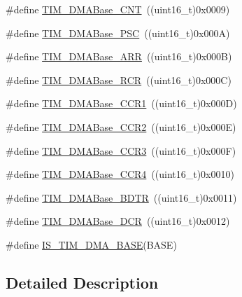 \begin{DoxyCompactItemize}
\#define \mbox{\hyperlink{group___t_i_m___d_m_a___base__address_gacab604257d144cf3a59b360cbc958ec9}{T\+I\+M\+\_\+\+D\+M\+A\+Base\+\_\+\+C\+NT}}~((uint16\+\_\+t)0x0009)
\item 
\#define \mbox{\hyperlink{group___t_i_m___d_m_a___base__address_gab8dd06970f235fe9f6997e0975237388}{T\+I\+M\+\_\+\+D\+M\+A\+Base\+\_\+\+P\+SC}}~((uint16\+\_\+t)0x000\+A)
\item 
\#define \mbox{\hyperlink{group___t_i_m___d_m_a___base__address_gaab8a66f70e59b5916b4bba344746d652}{T\+I\+M\+\_\+\+D\+M\+A\+Base\+\_\+\+A\+RR}}~((uint16\+\_\+t)0x000\+B)
\item 
\#define \mbox{\hyperlink{group___t_i_m___d_m_a___base__address_ga97f9edceee5c99b32aaa2c6daf849b7d}{T\+I\+M\+\_\+\+D\+M\+A\+Base\+\_\+\+R\+CR}}~((uint16\+\_\+t)0x000\+C)
\item 
\#define \mbox{\hyperlink{group___t_i_m___d_m_a___base__address_ga235a47fa47fd19594a111e6e48c0d5a2}{T\+I\+M\+\_\+\+D\+M\+A\+Base\+\_\+\+C\+C\+R1}}~((uint16\+\_\+t)0x000\+D)
\item 
\#define \mbox{\hyperlink{group___t_i_m___d_m_a___base__address_ga0e2150dcd3afe31ecb793aa471b3b972}{T\+I\+M\+\_\+\+D\+M\+A\+Base\+\_\+\+C\+C\+R2}}~((uint16\+\_\+t)0x000\+E)
\item 
\#define \mbox{\hyperlink{group___t_i_m___d_m_a___base__address_ga590c90085bd2b206b941dff2731fed74}{T\+I\+M\+\_\+\+D\+M\+A\+Base\+\_\+\+C\+C\+R3}}~((uint16\+\_\+t)0x000\+F)
\item 
\#define \mbox{\hyperlink{group___t_i_m___d_m_a___base__address_ga5e84a16e7d8ea369a3a55bb6fe1f2171}{T\+I\+M\+\_\+\+D\+M\+A\+Base\+\_\+\+C\+C\+R4}}~((uint16\+\_\+t)0x0010)
\item 
\#define \mbox{\hyperlink{group___t_i_m___d_m_a___base__address_gaaff22bbf3091c47783c1c68b648c8605}{T\+I\+M\+\_\+\+D\+M\+A\+Base\+\_\+\+B\+D\+TR}}~((uint16\+\_\+t)0x0011)
\item 
\#define \mbox{\hyperlink{group___t_i_m___d_m_a___base__address_ga59e2206e4e03b9d55c9fb5a24e29b01c}{T\+I\+M\+\_\+\+D\+M\+A\+Base\+\_\+\+D\+CR}}~((uint16\+\_\+t)0x0012)
\item 
\#define \mbox{\hyperlink{group___t_i_m___d_m_a___base__address_gaf565551f2619b1368fed7ef1ba7414de}{I\+S\+\_\+\+T\+I\+M\+\_\+\+D\+M\+A\+\_\+\+B\+A\+SE}}(B\+A\+SE)
\end{DoxyCompactItemize}


\subsection{Detailed Description}


